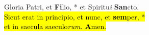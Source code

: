 Gloria Patri, et \textbf{Fi}lio, * et Spiritu\emph{i} \textbf{San}cto. \\
\hl{Sicut erat in principio, et nunc, et \textbf{sem}per, *\\
et in saecula saeculo\emph{rum.} \textbf{A}men.}
